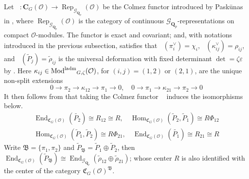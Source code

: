 \documentclass[leqno]{amsart}
\newcommand{\Gp}{\mathcal{G}_{\Qp}} %
\DeclareMathOperator{\laMod}{\textnormal{Mod}^\textnormal{ladm}}
\DeclareMathOperator{\Rep}{Rep}
\DeclareMathOperator{\V}{\check{\mathbf{V}}} %
\newcommand{\Qp}{\mathbf{Q}_p}
\newcommand{\C}{\mathbf C}
\newcommand{\oo}{\mathcal O}
\newcommand{\1}{\mathbf{1}}
\newcommand{\fC}{\mathfrak C}
\newcommand{\B}{\mathfrak B}
\DeclareMathOperator{\End}{End}
\DeclareMathOperator{\Hom}{Hom}
\theoremstyle{definition}
\theoremstyle{remark}
\begin{document}
Let $\V\colon \C_G(\oo)\to \Rep_{\Gp}(\oo)$
be the Colmez functor introduced by Pask\={u}nas
in \cite[\S 5.7]{pask},
where 
$\Rep_{\Gp}(\oo)$
is the category of continuous $\Gp$-representations
on compact $\oo$-modules.
The functor is exact and covariant;
and, with notations introduced 
in the previous subsection, satisfies that
$\V(\pi_i^\vee)=\chi_i$,
$\V(\kappa_{ij}^\vee)=\rho_{ij}$,
and $\V(\tilde{P}_j)=\tilde{\rho}_{ij}$
is the universal deformation
with fixed determinant $\det=\zeta\varepsilon$
by \cite[Cor 8.7]{pask}.
Here
$\kappa_{ij}\in \laMod_{G,\zeta}(\oo)$,
for $(i,j)=(1,2)$ or  $(2,1)$,
are the unique non-split extensions
\[
	0\to \pi_2\to \kappa_{12}\to \pi_1\to 0,\quad
	0\to \pi_1\to \kappa_{21}\to \pi_2\to 0
\]
It then follows from \cite[Lem 8.10]{pask} that 
taking the Colmez functor 
$\V$ induces the isomorphisms below.
\begin{equation}\label{eq:end_def}
\begin{split}
	\End_{\fC_{G}(\oo)}(\tilde{P_2})\cong R_{12}\cong R,\quad
	\Hom_{\fC_G(\oo)}(\tilde{P}_2, \tilde{P}_1)\cong R\Phi_{12}\\
	\Hom_{\fC_G(\oo)}(\tilde{P}_1, \tilde{P}_2)\cong R\Phi_{21},\quad
	\End_{\fC_{G}(\oo)}(\tilde{P_1})\cong R_{21}\cong R
\end{split}
\end{equation}
Write $\B=\{\pi_1,\pi_2\}$ 
and $ \tilde{P}_\B=\tilde{P}_1\oplus \tilde{P}_2$,
then $\End_{\fC_G(\oo)}(\tilde{P}_\B)\cong 
\End_{\Gp}(\tilde{\rho}_{12}\oplus \tilde{\rho}_{21})$;
whose center $R$ is also identified with 
the center of the category $\fC_G(\oo)^\B$.
\end{document}
